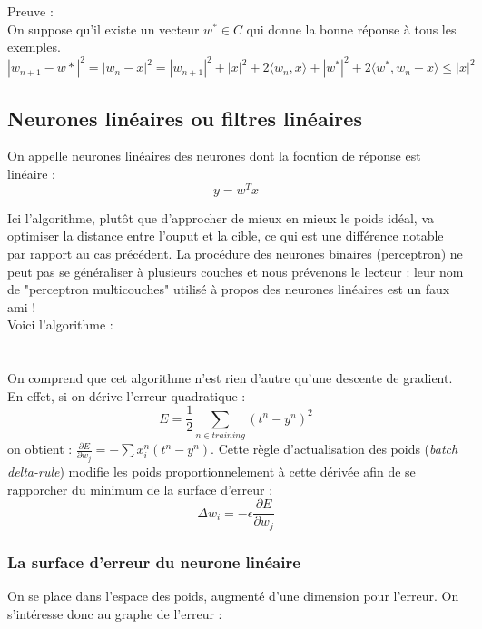 \documentclass{article}
\begin{document}
Preuve :\\%
On suppose qu'il existe un vecteur $w^*\in C$ qui donne la bonne réponse à tous les exemples.\\
\[|w_{n+1}-w*|^2=|w_n-x|^2=|w_{n+1}|^2+|x|^2+2\langle w_n,x\rangle+|w^*|^2+2\langle w^*,w_n-x\rangle \leq |x|^2\]

\subsection{Neurones linéaires ou filtres linéaires}
On appelle neurones linéaires des neurones dont la focntion de réponse est linéaire :
\[y=w^Tx\]

Ici l'algorithme, plutôt que d'approcher de mieux en mieux le poids idéal, va optimiser la distance entre l'ouput et la cible, ce qui est une différence notable par rapport au cas précédent. La procédure des neurones binaires (perceptron) ne peut pas se généraliser à plusieurs couches et nous prévenons le lecteur : leur nom de "perceptron multicouches" utilisé à propos des neurones linéaires est un faux ami ! \\

Voici l'algorithme :\\

\\
\\

On comprend que cet algorithme n'est rien d'autre qu'une descente de gradient. En effet, si on dérive l'erreur quadratique : \[E=\frac{1}{2}\sum_{n\in training}(t^n-y^n)^2\]
on obtient : $\frac{\partial E}{\partial w_j}=-\sum x_i^n(t^n-y^n)$. Cette règle d'actualisation des poids (\textit{batch delta-rule}) modifie les poids proportionnelement à cette dérivée afin de se rapporcher du minimum de la surface d'erreur :
\[\Delta w_i =-\epsilon \frac{\partial E}{\partial w_j}\]


\subsubsection{La surface d'erreur du neurone linéaire}
On se place dans l'espace des poids, augmenté d'une dimension pour l'erreur. On s'intéresse donc au graphe de l'erreur :
\end{document}
